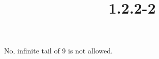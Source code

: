 \documentclass{article}
\title{1.2.2-2}
\begin{document}
\maketitle

No, infinite tail of 9 is not allowed.
\end{document}
